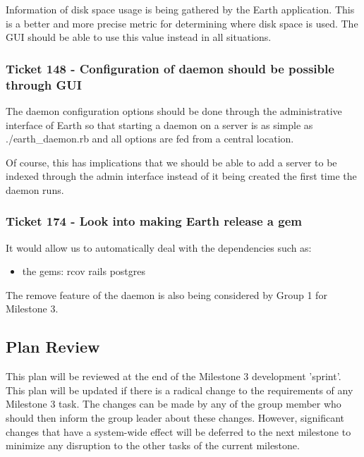 \documentclass[10pt,a4,oneside]{article}
\begin{document}
\noindent Information of disk space usage is being gathered by the Earth application.
This is a better and more precise metric for determining where disk space 
is used. The GUI should be able to use this value instead in all situations. 

\subsubsection*{Ticket 148 - Configuration of daemon should be possible through GUI}

\noindent The daemon configuration options should be done through the 
administrative interface of Earth so that starting a daemon on a server 
is as simple as ./earth\_daemon.rb and all options are fed from a central 
location.

\noindent Of course, this has implications that we should be able to add 
a server to be indexed through the admin interface instead of it being 
created the first time the daemon runs. 


\subsubsection*{ Ticket 174 - Look into making Earth release a gem}

\noindent It would allow us to automatically deal with the dependencies such as:

\begin{itemize}
\item the gems:
  \subitem rcov
  \subitem rails
  \subitem postgres 
\end{itemize}
 
\noindent The remove feature of the daemon is also being considered by Group 1 for Milestone 3. 

 
\subsection{Plan Review}
 
\noindent This plan will be reviewed at the end of the Milestone 3 development 'sprint'. This plan 
will be updated if there is a radical change to the requirements of any Milestone 3 task. 
The changes can be made by any of the group member who should then inform the group leader 
about these changes. However, significant changes that have a system-wide effect will be deferred 
to the next milestone to minimize any disruption to the other tasks of the current milestone.
\end{document}
